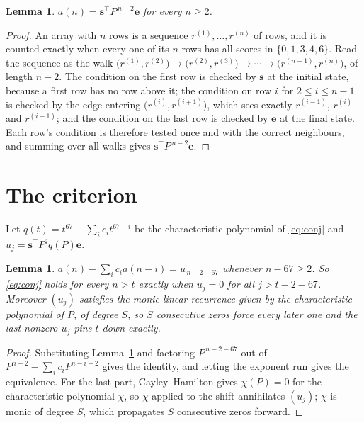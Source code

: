 \documentclass[11pt,a4paper]{article}
\theoremstyle{plain}
\newtheorem{lemma}[theorem]{Lemma}
\theoremstyle{definition}
\begin{document}
\begin{lemma}\label{lem:walk}
$a(n)=\mathbf{s}^{\!\top}P^{\,n-2}\mathbf{e}$ for every $n\ge2$.
\end{lemma}

\begin{proof}
An array with $n$ rows is a sequence $r^{(1)},\dots,r^{(n)}$ of rows, and it is counted
exactly when every one of its $n$ rows has all scores in $\{0,1,3,4,6\}$. Read the sequence as the
walk $\bigl(r^{(1)},r^{(2)}\bigr)\to\bigl(r^{(2)},r^{(3)}\bigr)\to\cdots\to
\bigl(r^{(n-1)},r^{(n)}\bigr)$, of length $n-2$. The condition on the first row is
checked by $\mathbf{s}$ at the initial state, because a first row has no row above it; the
condition on row $i$ for $2\le i\le n-1$ is checked by the edge entering
$\bigl(r^{(i)},r^{(i+1)}\bigr)$, which sees exactly $r^{(i-1)}$, $r^{(i)}$ and
$r^{(i+1)}$; and the condition on the last row is checked by $\mathbf{e}$ at the final
state. Each row's condition is therefore tested once and with the correct neighbours, and
summing over all walks gives $\mathbf{s}^{\!\top}P^{\,n-2}\mathbf{e}$.
\end{proof}

\section{The criterion}

Let $q(t)=t^{67}-\sum_i c_i t^{67-i}$ be the characteristic polynomial of
\eqref{eq:conj} and $u_j=\mathbf{s}^{\!\top}P^{j}q(P)\mathbf{e}$.

\begin{lemma}\label{lem:crit}
$a(n)-\sum_i c_i a(n-i)=u_{\,n-2-67}$ whenever $n-67\ge2$. So \eqref{eq:conj}
holds for every $n>t$ exactly when $u_j=0$ for all $j>t-2-67$. Moreover $(u_j)$
satisfies the monic linear recurrence given by the characteristic polynomial of $P$, of
degree $S$, so $S$ consecutive zeros force every later one and the last nonzero $u_j$ pins
$t$ down exactly.
\end{lemma}

\begin{proof}
Substituting Lemma~\ref{lem:walk} and factoring $P^{\,n-2-67}$ out of
$P^{n-2}-\sum_i c_i P^{n-i-2}$ gives the identity, and letting the exponent run gives the
equivalence. For the last part, Cayley--Hamilton gives $\chi(P)=0$ for the characteristic
polynomial $\chi$, so $\chi$ applied to the shift annihilates $(u_j)$; $\chi$ is monic of
degree $S$, which propagates $S$ consecutive zeros forward.
\end{proof}
\end{document}
